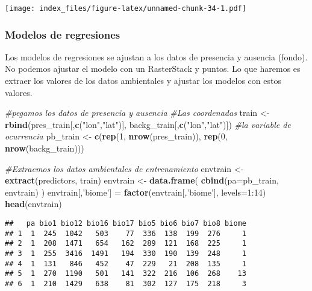 \documentclass[]{article}
\newenvironment{Shaded}{\begin{snugshade}}{\end{snugshade}}
\newcommand{\KeywordTok}[1]{\textcolor[rgb]{0.13,0.29,0.53}{\textbf{{#1}}}}
\newcommand{\DataTypeTok}[1]{\textcolor[rgb]{0.13,0.29,0.53}{{#1}}}
\newcommand{\DecValTok}[1]{\textcolor[rgb]{0.00,0.00,0.81}{{#1}}}
\newcommand{\StringTok}[1]{\textcolor[rgb]{0.31,0.60,0.02}{{#1}}}
\newcommand{\CommentTok}[1]{\textcolor[rgb]{0.56,0.35,0.01}{\textit{{#1}}}}
\newcommand{\NormalTok}[1]{{#1}}
\begin{document}
\texttt{[image: index\_files/figure-latex/unnamed-chunk-34-1.pdf]}

\subsubsection{Modelos de regresiones}\label{modelos-de-regresiones}

Los modelos de regresiones se ajustan a los datos de presencia y
ausencia (fondo). No podemos ajustar el modelo con un RasterStack y
puntos. Lo que haremos es extraer los valores de los datos ambientales y
ajustar los modelos con estos valores.

\begin{Shaded}
\begin{Highlighting}[]
\CommentTok{#pegamos los datos de presencia y ausencia}
\CommentTok{#Las coordenadas}
\NormalTok{train <-}\StringTok{ }\KeywordTok{rbind}\NormalTok{(pres_train[,}\KeywordTok{c}\NormalTok{(}\StringTok{"lon"}\NormalTok{,}\StringTok{"lat"}\NormalTok{)], backg_train[,}\KeywordTok{c}\NormalTok{(}\StringTok{"lon"}\NormalTok{,}\StringTok{"lat"}\NormalTok{)])}
\CommentTok{#la variable de ocurrencia}
\NormalTok{pb_train <-}\StringTok{ }\KeywordTok{c}\NormalTok{(}\KeywordTok{rep}\NormalTok{(}\DecValTok{1}\NormalTok{, }\KeywordTok{nrow}\NormalTok{(pres_train)), }\KeywordTok{rep}\NormalTok{(}\DecValTok{0}\NormalTok{, }\KeywordTok{nrow}\NormalTok{(backg_train)))}

\CommentTok{#Extraemos los datos ambientales de entrenamiento}
\NormalTok{envtrain <-}\StringTok{ }\KeywordTok{extract}\NormalTok{(predictors, train)}
\NormalTok{envtrain <-}\StringTok{ }\KeywordTok{data.frame}\NormalTok{( }\KeywordTok{cbind}\NormalTok{(}\DataTypeTok{pa=}\NormalTok{pb_train, envtrain) )}
\NormalTok{envtrain[,}\StringTok{'biome'}\NormalTok{] =}\StringTok{ }\KeywordTok{factor}\NormalTok{(envtrain[,}\StringTok{'biome'}\NormalTok{], }\DataTypeTok{levels=}\DecValTok{1}\NormalTok{:}\DecValTok{14}\NormalTok{)}
\KeywordTok{head}\NormalTok{(envtrain)}
\end{Highlighting}
\end{Shaded}

\begin{verbatim}
##   pa bio1 bio12 bio16 bio17 bio5 bio6 bio7 bio8 biome
## 1  1  245  1042   503    77  336  138  199  276     1
## 2  1  208  1471   654   162  289  121  168  225     1
## 3  1  255  3416  1491   194  330  190  139  248     1
## 4  1  131   846   452    47  229   21  208  135     1
## 5  1  270  1190   501   141  322  216  106  268    13
## 6  1  210  1429   638    81  302  127  175  218     3
\end{verbatim}
\end{document}
